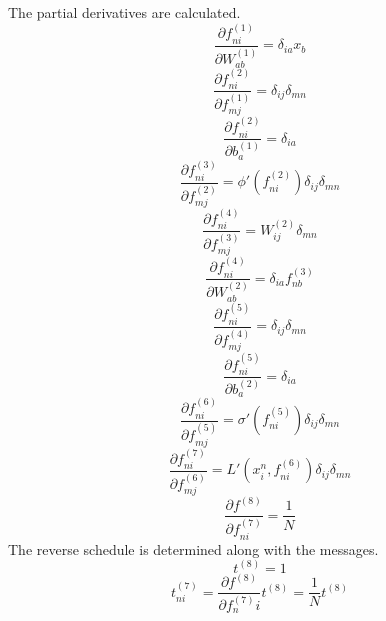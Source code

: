 \documentclass[fleqn]{article}
\begin{document}
The partial derivatives are calculated.
\begin{equation}
    \frac{\partial f^{(1)}_{ni}}{\partial W^{(1)}_{ab}} = \delta_{ia} x_b
\end{equation}
\begin{equation}
    \frac{\partial f^{(2)}_{ni}}{\partial f^{(1)}_{mj}} = \delta_{ij} \delta_{mn}
\end{equation}
\begin{equation}
    \frac{\partial f^{(2)}_{ni}}{\partial b^{(1)}_{a}} = \delta_{ia}
\end{equation}
\begin{equation}
    \frac{\partial f^{(3)}_{ni}}{\partial f^{(2)}_{mj}} = \phi'(f^{(2)}_{ni}) \delta_{ij} \delta_{mn}
\end{equation}
\begin{equation}
    \frac{\partial f^{(4)}_{ni}}{\partial f^{(3)}_{mj}} = W^{(2)}_{ij} \delta_{mn}
\end{equation}
\begin{equation}
    \frac{\partial f^{(4)}_{ni}}{\partial W^{(2)}_{ab}} = \delta_{ia} f^{(3)}_{nb}
\end{equation}
\begin{equation}
    \frac{\partial f^{(5)}_{ni}}{\partial f^{(4)}_{mj}} = \delta_{ij} \delta_{mn}
\end{equation}
\begin{equation}
    \frac{\partial f^{(5)}_{ni}}{\partial b^{(2)}_{a}} = \delta_{ia}
\end{equation}
\begin{equation}
    \frac{\partial f^{(6)}_{ni}}{\partial f^{(5)}_{mj}} = \sigma'\left(f^{(5)}_{ni}\right) \delta_{ij} \delta_{mn}
\end{equation}
\begin{equation}
    \frac{\partial f^{(7)}_{ni}}{\partial f^{(6)}_{mj}} = L'\left(x^n_i, f^{(6)}_{ni}\right) \delta_{ij} \delta_{mn}
\end{equation}
\begin{equation}
    \frac{\partial f^{(8)}}{\partial f^{(7)}_{ni}} = \frac{1}{N}
\end{equation}
The reverse schedule is determined along with the messages.
\begin{equation}
    t^{(8)} = 1
\end{equation}
\begin{equation}
    t^{(7)}_{ni} = \frac{\partial f^{(8)}}{\partial f^{(7)}_ni} t^{(8)} = \frac{1}{N} t^{(8)}
\end{equation}
\end{document}
